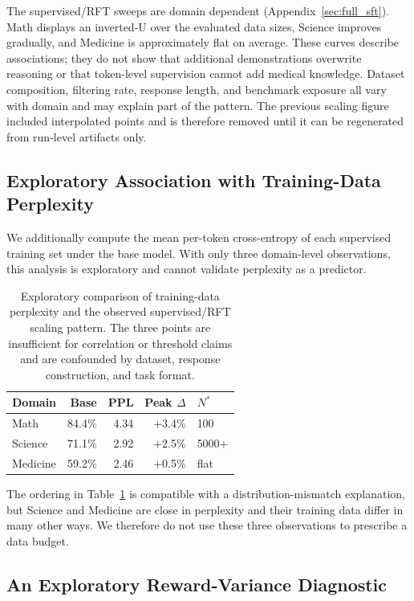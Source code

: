 \documentclass[11pt]{article}
\begin{document}
The supervised/RFT sweeps are domain dependent (Appendix~\ref{sec:full_sft}). Math displays an inverted-U over the evaluated data sizes, Science improves gradually, and Medicine is approximately flat on average. These curves describe associations; they do not show that additional demonstrations overwrite reasoning or that token-level supervision cannot add medical knowledge. Dataset composition, filtering rate, response length, and benchmark exposure all vary with domain and may explain part of the pattern. The previous scaling figure included interpolated points and is therefore removed until it can be regenerated from run-level artifacts only.

\subsection{Exploratory Association with Training-Data Perplexity}

We additionally compute the mean per-token cross-entropy of each supervised training set under the base model. With only three domain-level observations, this analysis is exploratory and cannot validate perplexity as a predictor.

\begin{table}[t]
\centering
\small
\begin{tabular}{@{}lrrrl@{}}
\toprule
\textbf{Domain} & \textbf{Base} & \textbf{PPL} & \textbf{Peak $\Delta$} & \textbf{$N^*$} \\
\midrule
Math & 84.4\% & 4.34 & +3.4\% & 100 \\
Science & 71.1\% & 2.92 & +2.5\% & 5000+ \\
Medicine & 59.2\% & 2.46 & +0.5\% & flat \\
\bottomrule
\end{tabular}
\caption{Exploratory comparison of training-data perplexity and the observed supervised/RFT scaling pattern. The three points are insufficient for correlation or threshold claims and are confounded by dataset, response construction, and task format.}
\label{tab:perplexity}
\end{table}

The ordering in Table~\ref{tab:perplexity} is compatible with a distribution-mismatch explanation, but Science and Medicine are close in perplexity and their training data differ in many other ways. We therefore do not use these three observations to prescribe a data budget.

\subsection{An Exploratory Reward-Variance Diagnostic}
\end{document}
